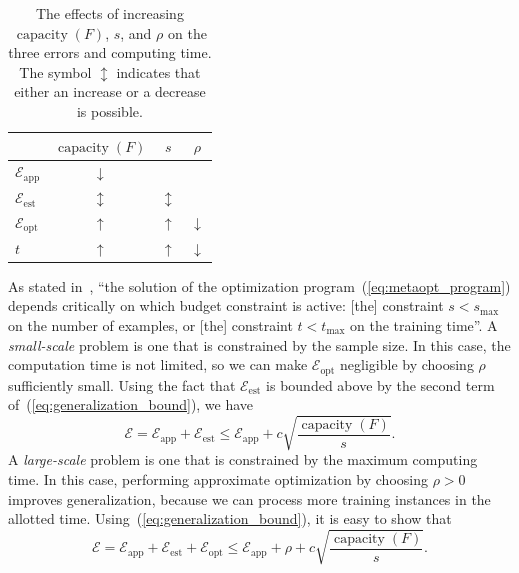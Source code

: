 \documentclass[11pt,a4paper]{article}
\numberwithin{equation}{section}
\newcommand{\capacity}{\operatorname{capacity}}
\newcommand{\apperr}{\mathcal{E}_{\mathrm{app}}}
\newcommand{\esterr}{\mathcal{E}_{\mathrm{est}}}
\newcommand{\opterr}{\mathcal{E}_{\mathrm{opt}}}
\begin{document}
\begin{table}
\centering
\begin{tabular}{lccc}
\toprule
& $\capacity(F)$ & $s$ & $\rho$ \\
\midrule
$\apperr$ & $\downarrow$ & \text{---} & \text{---} \\
$\esterr$ & $\updownarrow$ & $\updownarrow$ & \text{---} \\
$\opterr$ & $\uparrow$ & $\uparrow$ & $\downarrow$ \\
$t$ & $\uparrow$ & $\uparrow$ & $\downarrow$ \\
\bottomrule
\end{tabular}
\caption{The effects of increasing $\capacity(F)$, $s$, and $\rho$ on the three
errors and computing time. The symbol $\updownarrow$ indicates that either an
increase or a decrease is possible.\label{tab:metaopt_variables}}
\end{table}

As stated in~\citet{bousquet2008tradeoffs}, ``the solution of the optimization
program~(\ref{eq:metaopt_program}) depends critically on which budget constraint
is active: [the] constraint $s < s_{\text{max}}$ on the number of examples, or
[the] constraint $t < t_{\text{max}}$ on the training time''. A
\emph{small-scale} problem is one that is constrained by the sample size. In
this case, the computation time is not limited, so we can make $\opterr$
negligible by choosing $\rho$ sufficiently small. Using the fact that $\esterr$
is bounded above by the second term of~(\ref{eq:generalization_bound}), we have
\begin{equation}
	\mathcal{E} = \apperr + \esterr \leq \apperr + c
		\sqrt{\frac{\capacity(F)}{s}}.
	\label{eq:small_scale_bound}
\end{equation}
A \emph{large-scale} problem is one that is constrained by the maximum computing
time. In this case, performing approximate optimization by choosing $\rho > 0$
improves generalization, because we can process more training instances in the
allotted time. Using~(\ref{eq:generalization_bound}), it is easy to show that
\begin{equation}
	\mathcal{E}
	= \apperr + \esterr + \opterr
	\leq \apperr + \rho + c\sqrt{\frac{\capacity(F)}{s}}.
	\label{eq:large_scale_bound}
\end{equation}
\end{document}
